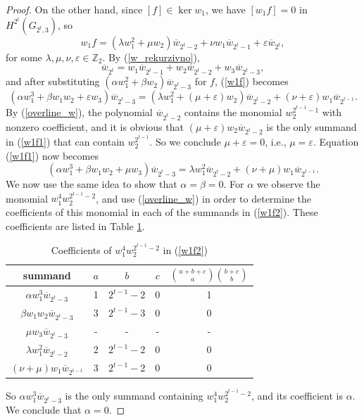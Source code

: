 \documentclass[10pt,a4paper]{amsart}
\begin{document}
\begin{proof}
    On the other hand, since $[f]\in \ker w_1$, we have $[w_1f] = 0$ in $H^{2^t}(G_{2^t,3})$, so
    \begin{equation}\label{w1f}
        w_1f = (\lambda w_1^2 + \mu w_2) \overline w_{2^t-2} + \nu w_1 \overline w_{2^t-1} + \varepsilon \overline w_{2^t},
    \end{equation}
    for some $\lambda, \mu, \nu, \varepsilon\in\mathbb Z_2$. By (\ref{w_rekurzivno}),
    \[\overline w_{2^t} = w_1\overline w_{2^t-1} + w_2\overline w_{2^t-2} + w_3\overline w_{2^t-3},\]
    and after substituting $(\alpha w_1^2 + \beta w_2)\overline w_{2^t-3}$ for $f$, (\ref{w1f}) becomes
    \begin{equation} \label{w1f1}
        (\alpha w_1^3 + \beta w_1 w_2 + \varepsilon w_3)\overline w_{2^t-3} = (\lambda w_1^2 + (\mu+ \varepsilon) w_2) \overline w_{2^t-2} + (\nu + \varepsilon)w_1\overline w_{2^{t-1}}.
    \end{equation}
By (\ref{overline_w}), the polynomial $\overline w_{2^t-2}$ contains the monomial $w_2^{2^{t-1}-1}$ with nonzero coefficient, and it is obvious that $(\mu+ \varepsilon) w_2\overline w_{2^t-2}$ is the only summand in (\ref{w1f1}) that can contain $w_2^{2^{t-1}}$. So we conclude $\mu+ \varepsilon=0$, i.e., $\mu = \varepsilon$. Equation (\ref{w1f1}) now becomes
    \begin{equation}\label{w1f2}
        (\alpha w_1^3 + \beta w_1 w_2 + \mu w_3)\overline w_{2^t-3} = \lambda w_1^2 \overline w_{2^t-2} + (\nu + \mu)w_1\overline w_{2^{t-1}}.
    \end{equation}
We now use the same idea to show that $\alpha =\beta = 0$. For $\alpha$ we observe the monomial $w_1^4w_2^{2^{t-1}-2}$, and use (\ref{overline_w}) in order to determine the coefficients of this monomial in each of the summands in (\ref{w1f2}). These coefficients are listed in Table \ref{tab:alpha}.
\begin{table}[h]
\renewcommand{\arraystretch}{1.5} %
\begin{tabular}{|c|c|c|c|c|}
 \hline
summand & $a$ & $b$ & $c$ &  $\binom{a+b+c}{a}\binom{b+c}{b}$ \\ [1ex]
 \hline
$\alpha w_1^3\overline w_{2^t-3}$ & 1 & $2^{t-1}-2$ & 0 &   1\\ 
$\beta w_1w_2\overline w_{2^t-3}$ & 3 & $2^{t-1}-3$ & 0 &   0\\
$\mu w_3\overline w_{2^t-3}$ & - & - & - &   -\\
$\lambda w_1^2 \overline w_{2^t-2}$ & 2 & $2^{t-1}-2$ & 0 &   0\\
$(\nu + \mu)w_1\overline w_{2^{t-1}}$ & 3 & $2^{t-1}-2$ & 0 &   0\\
 \hline
  \end{tabular}
\caption{\label{tab:alpha} Coefficients of $w_1^4w_2^{2^{t-1}-2}$ in (\ref{w1f2})}
\end{table}
So $\alpha w_1^3\overline w_{2^t-3}$ is the only summand containing $w_1^4w_2^{2^{t-1}-2}$, and its coefficient is $\alpha$. We conclude that $\alpha =0$.


\end{proof}
\end{document}

